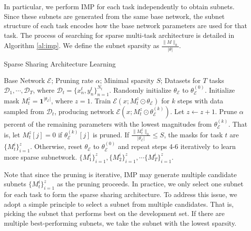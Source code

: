 \documentclass[letterpaper]{article} %
\begin{document}
In particular, we perform IMP for each task independently to obtain subnets. Since these subnets are generated from the same base network, the subnet structure of each task encodes how the base network parameters are used for that task. The process of searching for sparse multi-task architecture is detailed in Algorithm \ref{al:imp}. We define the subnet sparsity as $\frac{\|M\|_0}{|\theta|}$.

\begin{algorithm}[hbt]
\caption{Sparse Sharing Architecture Learning}
\label{al:imp}
\begin{algorithmic}[1]
\Require Base Network $\mathcal{E}$; Pruning rate $\alpha$; Minimal sparsity $S$; Datasets for $T$ tasks $\mathcal{D}_1,\cdots,\mathcal{D}_T$, where $\mathcal{D}_t = \{ x^t_n,y^t_n \}^{N_t}_{n=1}$.
\State Randomly initialize $\theta_\mathcal{E}$ to $\theta_\mathcal{E}^{(0)}$.
\State Initialize mask $M_t^z=\mathbf{1}^{|\theta_\mathcal{E}|}$, where $z=1$.
\State Train $\mathcal{E}(x; M_t^z\odot \theta_\mathcal{E})$ for $k$ steps with data sampled from $\mathcal{D}_t$, producing network $\mathcal{E}(x; M_t^z\odot \theta_\mathcal{E}^{(k)})$. Let $z \gets z+1$.
\State Prune $\alpha$ percent of the remaining parameters with the lowest magnitudes from $\theta_\mathcal{E}^{(k)}$. That is, let $M_t^{z}[j]=0$ if $\theta_\mathcal{E}^{(k)}[j]$ is pruned.
\State If $\frac{\|M_t^z\|_0}{|\theta_\mathcal{E}|}\le S$, the masks for task $t$ are $\{M_t^i\}_{i=1}^z$.
\State Otherwise, reset $\theta_\mathcal{E}$ to $\theta_\mathcal{E}^{(0)}$ and repeat steps 4-6 iteratively to learn more sparse subnetwork.
\EndFor
\State \Return $\{M_1^i\}_{i=1}^z, \{M_2^i\}_{i=1}^z, \cdots \{M_T^i\}_{i=1}^z$.
\end{algorithmic}
\end{algorithm}

Note that since the pruning is iterative, IMP may generate multiple candidate subnets $\{M_t^i\}_{i=1}^z$ as the pruning proceeds. In practice, we only select one subnet for each task to form the sparse sharing architecture. To address this issue, we adopt a simple principle to select a subnet from multiple candidates. That is, picking the subnet that performs best on the development set. If there are multiple best-performing subnets, we take the subnet with the lowest sparsity.
\end{document}
